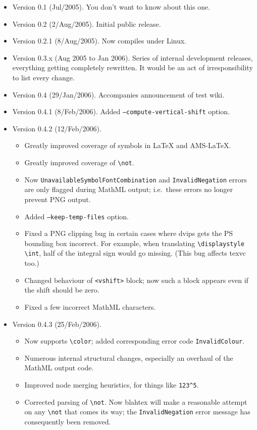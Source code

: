 \documentclass{article}
\newcommand{\texcommand}[1]{\textbackslash{}#1}
\begin{document}
\begin{itemize}
\item Version 0.1 (Jul/2005). You don't want to know about this one.
\item Version 0.2  (2/Aug/2005). Initial public release.
\item Version 0.2.1 (8/Aug/2005). Now compiles under Linux.
\item Version 0.3.x (Aug 2005 to Jan 2006). Series of internal development releases, everything getting completely rewritten. It would be an act of irresponsibility to list every change.
\item Version 0.4 (29/Jan/2006). Accompanies announcement of test wiki.
\item Version 0.4.1 (8/Feb/2006). Added \texttt{--compute-vertical-shift} option.
\item Version 0.4.2 (12/Feb/2006).
\begin{itemize}
\item Greatly improved coverage of symbols in \LaTeX{} and AMS-\LaTeX.
\item Greatly improved coverage of \texttt{\texcommand{not}}.
\item Now \texttt{UnavailableSymbolFontCombination} and \texttt{InvalidNegation} errors are only flagged during MathML output; i.e.~these errors no longer prevent PNG output.
\item Added \texttt{--keep-temp-files} option.
\item Fixed a PNG clipping bug in certain cases where dvips gets the PS bounding box incorrect. For example, when translating \texttt{\texcommand{displaystyle} \texcommand{int}}, half of the integral sign would go missing. (This bug affects texvc too.)
\item Changed behaviour of \texttt{<vshift>} block; now such a block appears even if the shift should be zero.
\item Fixed a few incorrect MathML characters.
\end{itemize}
\item Version 0.4.3 (25/Feb/2006).
\begin{itemize}
\item Now supports \texttt{\texcommand{color}}; added corresponding error code \texttt{InvalidColour}.
\item Numerous internal structural changes, especially an overhaul of the MathML output code.
\item Improved node merging heuristics, for things like \texttt{123\textasciicircum5}.
\item Corrected parsing of \texttt{\texcommand{not}}. Now blahtex will make a reasonable attempt on any \texttt{\texcommand{not}} that comes its way; the \texttt{InvalidNegation} error message has consequently been removed.

\end{itemize}
\end{itemize}
\end{document}
